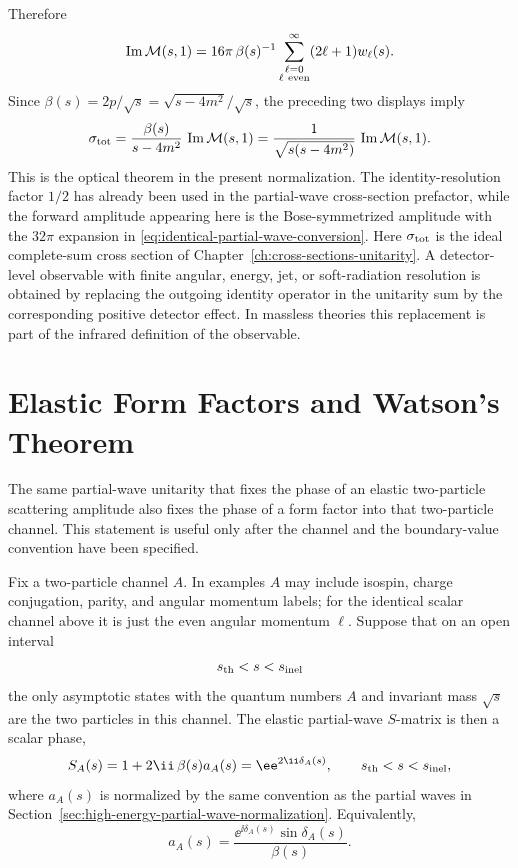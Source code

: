 Therefore
\[
  \operatorname{Im}\mathcal M(s,1)
  =
  16\pi\,\beta(s)^{-1}
  \sum_{\substack{\ell=0\\ \ell\ {\rm even}}}^{\infty}
  (2\ell+1)w_\ell(s).
\]
Since \(\beta(s)=2p/\sqrt s=\sqrt{s-4m^2}/\sqrt s\), the preceding two
displays imply
\[
  \sigma_{\rm tot}
  =
  \frac{\beta(s)}{s-4m^2}\,
  \operatorname{Im}\mathcal M(s,1)
  =
  \frac{1}{\sqrt{s(s-4m^2)}}\,
  \operatorname{Im}\mathcal M(s,1).
\]
This is the optical theorem in the present normalization.  The
identity-resolution factor \(1/2\) has already been used in the partial-wave
cross-section prefactor, while the forward amplitude appearing here is the
Bose-symmetrized amplitude with the \(32\pi\) expansion in
\eqref{eq:identical-partial-wave-conversion}.
Here \(\sigma_{\rm tot}\) is the ideal complete-sum cross section of
Chapter~\ref{ch:cross-sections-unitarity}.  A detector-level observable with
finite angular, energy, jet, or soft-radiation resolution is obtained by
replacing the outgoing identity operator in the unitarity sum by the
corresponding positive detector effect.  In massless theories this replacement
is part of the infrared definition of the observable.

\section{Elastic Form Factors and Watson's Theorem}
\label{sec:watson-theorem-elastic-form-factors}

The same partial-wave unitarity that fixes the phase of an elastic
two-particle scattering amplitude also fixes the phase of a form factor into
that two-particle channel.  This statement is useful only after the channel
and the boundary-value convention have been specified.

Fix a two-particle channel \(A\).  In examples \(A\) may include isospin,
charge conjugation, parity, and angular momentum labels; for the identical
scalar channel above it is just the even angular momentum \(\ell\).  Suppose
that on an open interval
\[
  s_{\rm th}<s<s_{\rm inel}
\]
the only asymptotic states with the quantum numbers \(A\) and invariant mass
\(\sqrt s\) are the two particles in this channel.  The elastic partial-wave
\(S\)-matrix is then a scalar phase,
\begin{equation}
  S_A(s)
  =
  1+2\ii\,\beta(s)a_A(s)
  =
  \ee^{2\ii\delta_A(s)} ,
  \qquad s_{\rm th}<s<s_{\rm inel},
  \label{eq:watson-elastic-s-phase}
\end{equation}
where \(a_A(s)\) is normalized by the same convention as the partial waves in
Section~\ref{sec:high-energy-partial-wave-normalization}.  Equivalently,
\[
  a_A(s)=\frac{\ee^{\ii\delta_A(s)}\sin\delta_A(s)}{\beta(s)} .
\]

